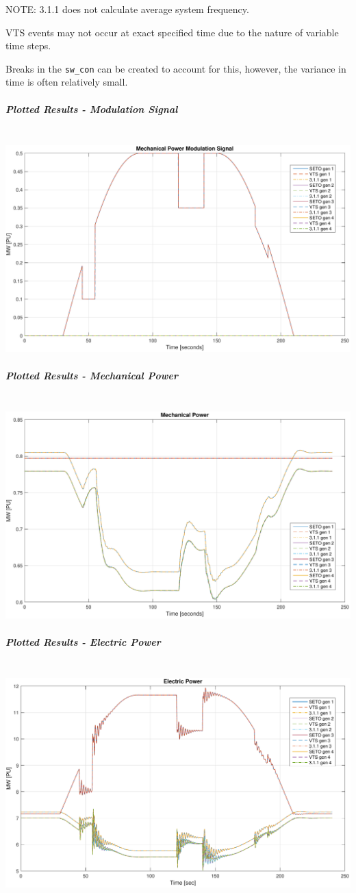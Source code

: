 \documentclass[12pt]{article}
\begin{document}
NOTE: 3.1.1 does not calculate average system frequency.

VTS events may not occur at exact specified time due to the nature of variable time steps.

Breaks in the \verb|sw_con| can be created to account for this, however, the variance in time is often relatively small.


\pagebreak
\subparagraph{Plotted Results - Modulation Signal} \ \\
\includegraphics[width=\linewidth]{verPmSig}
\subparagraph{Plotted Results - Mechanical Power} \ \\
\includegraphics[width=\linewidth]{verPmech}
\subparagraph{Plotted Results - Electric Power} \ \\
\includegraphics[width=\linewidth]{verPelect}
\end{document}
